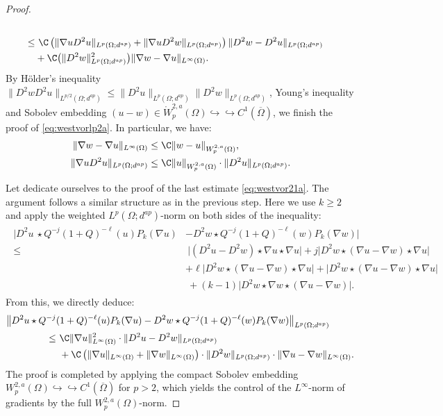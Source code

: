\documentclass[12pt,a4paper,twoside]{article}
\newcommand {\cb}[1] {\tikz[baseline=(char.base)]{
            \node[shape=circle,draw,inner sep=2pt] (char) {\itshape{\textbf{#1}}};}}
\begin{document}
\begin{proof}
\begin{align*}
    \\
    \le &\ \C  \left(
        \| \nabla u D^2u \|_{L^{p}(\Omega;d^{ap})} +  \| \nabla u D^2w \|_{L^{p}(\Omega;d^{ap})}
\right)\|D^2 w - D^2 u\| _{L^{p}(\Omega;d^{ap})} 
 \\
  &  +  \C  \big( \| D^2w \|_{L^{p}(\Omega;d^{ap})}^2\big)\|\nabla w-\nabla u\| _{L^\infty({\Omega})}. 
\end{align*}
By Hölder's inequality $\|D^2 w  D^2 u\| _{L^{p/2}(\Omega;d^{ap})}\le \|D^2 u \| _{L^{p}(\Omega;d^{ap})}\|D^2 w\| _{L^{p}(\Omega;d^{ap})}$, Young's inequality and Sobolev embedding  $(u-w)\in \mathring W^{2,a}_p(\Omega)\hookrightarrow\hookrightarrow C^1(\overline{\Omega})$, we finish the proof of \eqref{eq:westvorlp2a}. In particular, we have:
\begin{align*}
    \|\nabla w-\nabla u\| _{L^\infty({\Omega})}& \le \C \| w- u\| _{W^{2,a}_p(\Omega)}, 
    \\ 
    \| \nabla u D^2u \|_{L^{p}(\Omega;d^{ap})} & \le \C \| u\| _{W^{2,a}_p(\Omega)}\cdot \| D^2u \|_{L^{p}(\Omega;d^{ap})}.
\end{align*}


\noindent\cb 3 Let dedicate ourselves to the proof of the last estimate \eqref{eq:westvor21a}. The argument follows a similar structure as in the previous step. Here we use $k\ge 2$ and apply the weighted $L^p(\Omega;d^{ap})$-norm on both sides of the inequality: 
\begin{align*}
\begin{aligned}
    \big| D^2 u\  \star   Q^{-j}(1+Q)^{-\ell}(u)P_{k}(\nabla u)
     & - D^2 w \star Q^{-j}(1+Q)^{-\ell}(w)P_{k}(\nabla w) \big| 
    \\ \le &\   
      \big|(D^2u-D^2w)\star \nabla u \star \nabla u \big| + j  \big|D^2 w \star (\nabla u-\nabla w)\star \nabla u \big| \\
    & +  \ell \big|D^2 w \star (\nabla u-\nabla w)\star \nabla u \big|
    +   \big|D^2 w  \star(\nabla u-\nabla w) \star \nabla u\big| \\
    &\ + (k-1)\big|D^2 w   \star \nabla w\star(\nabla u-\nabla w)\big|.
\end{aligned} 
\end{align*}
From this, we directly deduce:
\begin{align*}
        \big\| D^2 u \star   Q^{-j}& (1+Q)^{-\ell}(u)  P_{k}  (\nabla u)
    -  D^2 w \star Q^{-j}(1+Q)^{-\ell}(w)P_{k}(\nabla w) \big\|_{L^p(\Omega;d^{ap})} 
    \\ \le &\ \C
      \|\nabla u \|_{L^\infty({\Omega})}^2
     \cdot
      \|D^2u-D^2w\|_{L^{p}(\Omega;d^{ap})}  \\
       &\ + \C
      \left(\|\nabla u \|_{L^\infty(\Omega)}
      +\|\nabla w \|_{L^\infty(\Omega)}\right)
            \cdot
            \|D^2 w \|_{L^{p}(\Omega;d^{ap})}
            \cdot
      \|\nabla u- \nabla w\|_{L^\infty(\Omega)}
.
\end{align*}
The proof is completed by applying the compact Sobolev embedding
${W^{2,a}_p(\Omega)}\hookrightarrow\hookrightarrow C^1(\overline{\Omega})$ for $p>2$, which yields the control of the $L^\infty$-norm of gradients by the full $W^{2,a}_p(\Omega)$-norm.
\end{proof}
\end{document}
